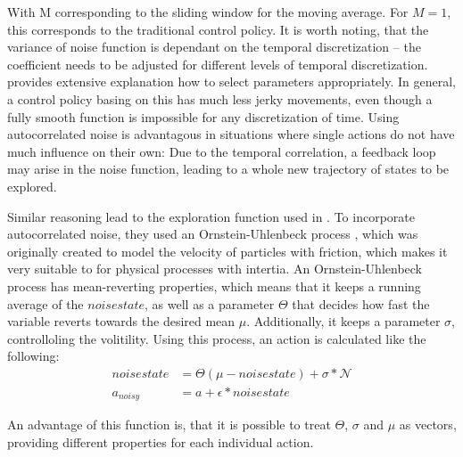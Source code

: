 With M corresponding to the sliding window for the moving average. For $M=1$, this corresponds to the traditional control policy. It is worth noting, that the variance of noise function is dependant on the temporal discretization -- the coefficient needs to be adjusted for different levels of temporal discretization. \cite{wawrzynski_control_2015} provides extensive explanation how to select parameters appropriately. In general, a control policy basing on this has much less jerky movements, even though a fully smooth function is impossible for any discretization of time. Using autocorrelated noise is advantagous in situations where single actions do not have much influence on their own: Due to the temporal correlation, a feedback loop may arise in the noise function, leading to a whole new trajectory of states to be explored.

Similar reasoning lead to the exploration function used in \cite{lillicrap_continuous_2015}. To incorporate autocorrelated noise, they used an Ornstein-Uhlenbeck process \cite{uhlenbeck_theory_1930}, which was originally created to model the velocity of particles with friction, which makes it very suitable to for physical processes with intertia. An Ornstein-Uhlenbeck process has mean-reverting properties, which means that it keeps a running average of the $noisestate$, as well as a parameter $\Theta$ that decides how fast the variable reverts towards the desired mean $\mu$. Additionally, it keeps a parameter $\sigma$, controlloling the volitility. Using this process, an action is calculated like the following:
\begin{align*}
	noisestate &= \Theta (\mu - noisestate) + \sigma * \mathcal{N}\\
	a_{noisy}  &= a + \epsilon * noisestate
\end{align*}

An advantage of this function is, that it is possible to treat $\Theta$, $\sigma$ and $\mu$ as vectors, providing different properties for each individual action.
 
 

